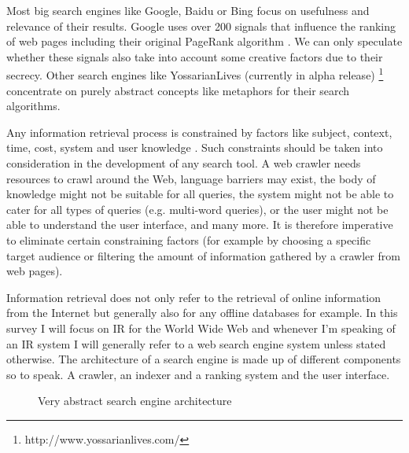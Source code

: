 Most big search engines like Google, Baidu or Bing focus on usefulness and relevance of their results.\citep{google.co.uk, Baidu2012, Microsoft2012a} Google uses over 200 signals \citep{Google2012} that influence the ranking of web pages including their original PageRank algorithm \citep{Brin1998, Brin1998b}. We can only speculate whether these signals also take into account some creative factors due to their secrecy. Other search engines like YossarianLives (currently in alpha release) \footnote{http://www.yossarianlives.com/} concentrate on purely abstract concepts like metaphors for their search algorithms.

Any information retrieval process is constrained by factors like subject, context, time, cost, system and user knowledge \citep{Marchionini1988}. Such constraints should be taken into consideration in the development of any search tool. A web crawler needs resources to crawl around the Web, language barriers may exist, the body of knowledge might not be suitable for all queries, the system might not be able to cater for all types of queries (e.g. multi-word queries), or the user might not be able to understand the user interface, and many more. It is therefore imperative to eliminate certain constraining factors (for example by choosing a specific target audience or filtering the amount of information gathered by a crawler from web pages).

Information retrieval does not only refer to the retrieval of online information from the Internet but generally also for any offline databases for example. In this survey I will focus on IR for the World Wide Web and whenever I'm speaking of an IR system I will generally refer to a web search engine system unless stated otherwise. The architecture of a search engine is made up of different components so to speak. A crawler, an indexer and a ranking system and the user interface.

\begin{figure}
\centering
{}
\caption[Search Engine Architecture]{Very abstract search engine architecture}
\label{fig:SEA}
\end{figure}

